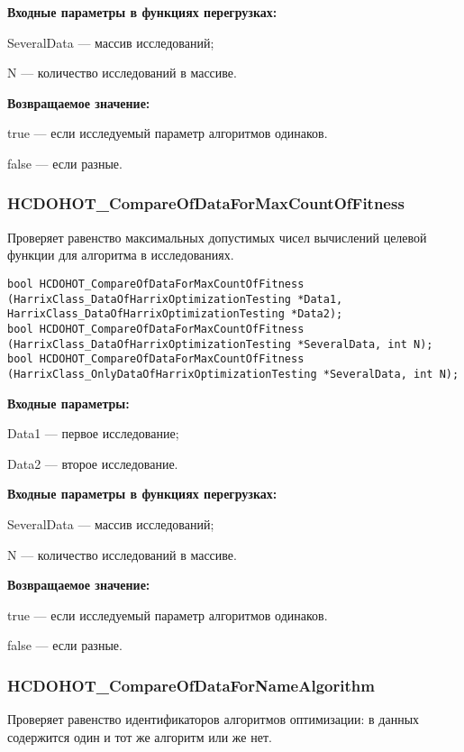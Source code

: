 \documentclass[a4paper,12pt]{article}
\begin{document}
\textbf{Входные параметры в функциях перегрузках:}

SeveralData --- массив исследований;
 
N --- количество исследований в массиве.

\textbf{Возвращаемое значение:}

true --- если исследуемый параметр алгоритмов одинаков.
 
false --- если разные.


\subsubsection{HCDOHOT\_CompareOfDataForMaxCountOfFitness}\label{HCDOHOT_CompareOfDataForMaxCountOfFitness}

Проверяет равенство максимальных допустимых чисел вычислений целевой функции для алгоритма в исследованиях.


\begin{lstlisting}[label=code_syntax_HCDOHOT_CompareOfDataForMaxCountOfFitness,caption=Синтаксис]
bool HCDOHOT_CompareOfDataForMaxCountOfFitness (HarrixClass_DataOfHarrixOptimizationTesting *Data1, HarrixClass_DataOfHarrixOptimizationTesting *Data2);
bool HCDOHOT_CompareOfDataForMaxCountOfFitness (HarrixClass_DataOfHarrixOptimizationTesting *SeveralData, int N);
bool HCDOHOT_CompareOfDataForMaxCountOfFitness (HarrixClass_OnlyDataOfHarrixOptimizationTesting *SeveralData, int N);
\end{lstlisting}

\textbf{Входные параметры:}

Data1 --- первое исследование;
 
Data2 --- второе исследование.
	 
\textbf{Входные параметры в функциях перегрузках:}

SeveralData --- массив исследований;
 
N --- количество исследований в массиве.

\textbf{Возвращаемое значение:}

true --- если исследуемый параметр алгоритмов одинаков.
 
false --- если разные.


\subsubsection{HCDOHOT\_CompareOfDataForNameAlgorithm}\label{HCDOHOT_CompareOfDataForNameAlgorithm}

Проверяет равенство идентификаторов алгоритмов оптимизации: в данных содержится один и тот же алгоритм или же нет.
\end{document}
